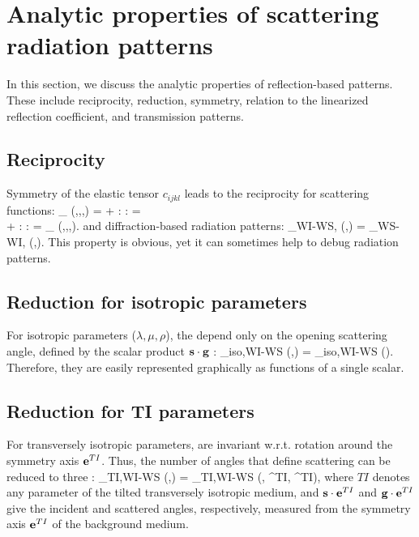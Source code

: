 \section{Analytic properties of scattering radiation patterns}
In this section, we discuss the analytic properties of reflection-based patterns. These include reciprocity, reduction, symmetry, relation to the linearized reflection coefficient, and transmission patterns.
\subsection{Reciprocity}
Symmetry of the elastic tensor $c_{ijkl}$ leads to the reciprocity 
for scattering functions:
\beq
\SF_{\delta\mv} (\sv,\spv,\gv,\gpv) = 
\spv \cdot \gpv \delta \rho + \sv \tmul \spv : \delta \cv : \gv \tmul \gpv = \\
\gpv \cdot \spv \delta \rho +  \gv \tmul \gpv : \delta \cv : \sv \tmul \spv = 
\SF_{\delta\mv} (\gv,\gpv,\sv,\spv). 
\eeq
and diffraction-based radiation patterns:
\beq
\Dp_{WI-WS,\delta\mv} (\sv,\gv) = \Dp_{WS-WI,\delta\mv} (\gv,\sv).
\eeq 
This property is obvious, yet it can sometimes help to debug radiation patterns. 

\subsection{Reduction for isotropic parameters}
For isotropic parameters ($\lambda, \mu, \rho$), the \dP depend only on the 
opening scattering angle, defined by the scalar product $\mathbf{s}\cdot\mathbf{g}$ \citep[e.g.,][]{wu1985}: 
\beq
\Dp_{iso,WI-WS} (\sv,\gv) = \Dp_{iso,WI-WS} (\sv \cdot \gv).
\eeq
Therefore, they are easily represented graphically as functions of a single scalar. 

\subsection{Reduction for TI parameters}
For transversely isotropic parameters, \dP are invariant w.r.t. rotation around 
the symmetry axis $\mathbf{e}^{TI}$. Thus, the number of angles that 
define scattering can be reduced to three \citep{calvet2006}:
\beq
\Dp_{TI,WI-WS} (\sv,\gv) = \Dp_{TI,WI-WS} (\sv \cdot \gv, \sv \cdot \ev^{TI}, \gv 
\cdot \ev^{TI}),
\eeq
where $TI$ denotes any parameter of the tilted transversely isotropic medium, and $\mathbf{s} \cdot \mathbf{e}^{TI}$ and $\mathbf{g} 
\cdot \mathbf{e}^{TI}$ give the incident and scattered angles, respectively, measured from the symmetry axis $\mathbf{e}^{TI}$ of the background medium.

